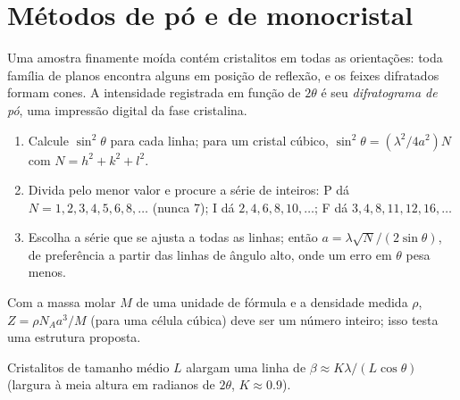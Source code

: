 \section{Métodos de pó e de monocristal}

\begin{definition}[Difratograma de pó]\label{def:b3:x-ray-diffraction:powder}
Uma amostra finamente moída contém cristalitos em todas as orientações: toda
família de planos encontra alguns em posição de reflexão, e os feixes difratados
formam cones. A intensidade registrada em função de $2\theta$ é seu \emph{difratograma
de pó}, uma impressão digital da
fase cristalina.
\end{definition}

\begin{method}\label{met:b3:x-ray-diffraction:index-cubic}
\begin{enumerate}
  \item Calcule $\sin^2\theta$ para cada linha; para um cristal cúbico, $\sin^2\theta =
        (\lambda^2/4a^2)N$ com $N = h^2 + k^2 + l^2$.
  \item Divida pelo menor valor e procure a série de inteiros: P dá
        $N = 1, 2, 3, 4, 5, 6, 8, \dots$ (nunca 7); I dá $2, 4, 6, 8, 10, \dots$; F dá
        $3, 4, 8, 11, 12, 16, \dots$
  \item Escolha a série que se ajusta a todas as linhas; então $a = \lambda\sqrt N/(2\sin\theta)$,
        de preferência a partir das linhas de ângulo alto, onde um erro em $\theta$ pesa menos.
\end{enumerate}
\end{method}

\begin{method}\label{met:b3:x-ray-diffraction:z-from-density}
Com a massa molar $M$ de uma unidade de fórmula e a densidade medida $\rho$, $Z =
\rho N_Aa^3/M$ (para uma célula cúbica) deve ser um número inteiro; isso testa
uma estrutura proposta.
\end{method}

\begin{proposition}\label{prop:b3:x-ray-diffraction:scherrer}
Cristalitos de tamanho médio $L$ alargam uma linha de $\beta \approx K\lambda/(L\cos\theta)$
(largura à meia altura em radianos de $2\theta$, $K \approx 0.9$).
\end{proposition}
\admitted


